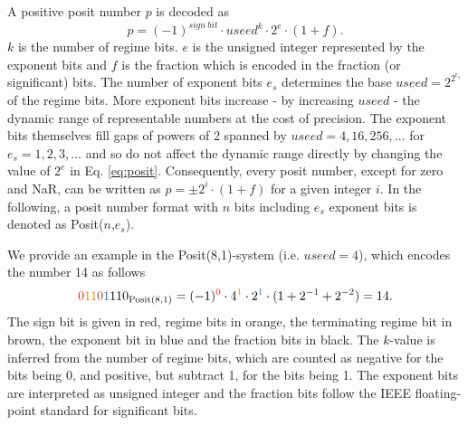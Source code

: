 \documentclass[draft]{agujournal2019}
\newcommand{\op}{\operatorname}
\begin{document}
A positive posit number $p$ is decoded as \cite{Gustafson2017,Gustafson2017a,Chen2018,Klower2019}
\begin{equation}
p = (-1)^{sign~bit} \cdot useed^k \cdot 2^e \cdot (1+f).
\label{eq:posit}
\end{equation}
$k$ is the number of regime bits. $e$ is the unsigned integer represented by the exponent bits and $f$ is the fraction which is encoded in the fraction (or significant) bits. The number of exponent bits $e_s$ determines the base $useed = 2^{2^{e_s}}$ of the regime bits. More exponent bits increase - by increasing $useed$ - the dynamic range of representable numbers at the cost of precision. The exponent bits themselves fill gaps of powers of 2 spanned by $useed = 4,16,256,...$ for $e_s=1,2,3,...$ and so do not affect the dynamic range directly by changing the value of $2^e$ in Eq. \ref{eq:posit}. Consequently, every posit number, except for zero and NaR, can be written as $p = \pm 2^i \cdot (1+f)$ for a given integer $i$. In the following, a posit number format with $n$ bits including $e_s$ exponent bits is denoted as Posit($n$,$e_s$).

We provide an example in the Posit(8,1)-system (i.e. $useed = 4$), which encodes the number 14 as follows
\begin{equation}
{\color{psign}0}{\color{pregime}11}{\color{pregimet}0}{\color{pexpo}1}110_{\op{Posit}(8,1)} = (-1)^{\color{psign}0} \cdot 4^{\color{pregime}1} \cdot 2^{\color{pexpo}1} \cdot (1+2^{-1}+2^{-2}) = 14.
\label{eq:posit_pos}
\end{equation}
The sign bit is given in red, regime bits in orange, the terminating regime bit in brown, the exponent bit in blue and the fraction bits in black. The $k$-value is inferred from the number of regime bits, which are counted as negative for the bits being 0, and positive, but subtract 1, for the bits being 1. The exponent bits are interpreted as unsigned integer and the fraction bits follow the IEEE floating-point standard for significant bits.
\end{document}
